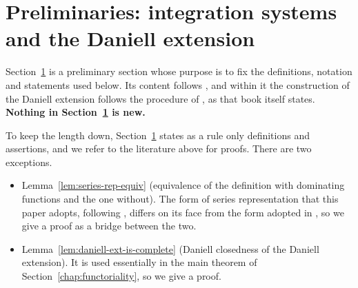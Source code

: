 \section{Preliminaries: integration systems and the Daniell extension}\label{chap:preliminaries}

Section~\ref{chap:preliminaries} is a preliminary section whose purpose is to fix
the definitions, notation and statements used below.
Its content follows \cite{Yamagami}, and within it the construction of the
Daniell extension follows the procedure of \cite{BM}, as that book itself states.
\textbf{Nothing in Section~\ref{chap:preliminaries} is new.}

To keep the length down, Section~\ref{chap:preliminaries} states as a rule only
definitions and assertions, and we refer to the literature above for proofs.
There are two exceptions.

\begin{itemize}
  \item Lemma~\ref{lem:series-rep-equiv} (equivalence of the definition with
    dominating functions and the one without).
    The form of series representation that this paper adopts, following
    \cite{Yamagami}, differs on its face from the form adopted in \cite{BM}, so
    we give a proof as a bridge between the two.
  \item Lemma~\ref{lem:daniell-ext-is-complete} (Daniell closedness of the
    Daniell extension).
    It is used essentially in the main theorem of
    Section~\ref{chap:functoriality}, so we give a proof.
\end{itemize}











